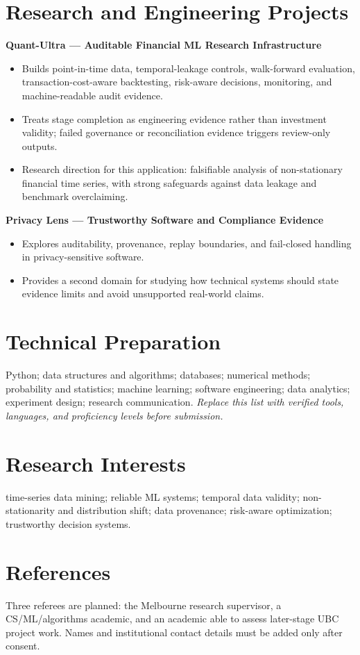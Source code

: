 \documentclass[11pt]{article}
\begin{document}
\section*{Research and Engineering Projects}
\textbf{Quant-Ultra --- Auditable Financial ML Research Infrastructure}
\begin{itemize}
\item Builds point-in-time data, temporal-leakage controls, walk-forward evaluation, transaction-cost-aware backtesting, risk-aware decisions, monitoring, and machine-readable audit evidence.
\item Treats stage completion as engineering evidence rather than investment validity; failed governance or reconciliation evidence triggers review-only outputs.
\item Research direction for this application: falsifiable analysis of non-stationary financial time series, with strong safeguards against data leakage and benchmark overclaiming.
\end{itemize}

\begin{samepage}
\textbf{Privacy Lens --- Trustworthy Software and Compliance Evidence}
\begin{itemize}
\item Explores auditability, provenance, replay boundaries, and fail-closed handling in privacy-sensitive software.
\item Provides a second domain for studying how technical systems should state evidence limits and avoid unsupported real-world claims.
\end{itemize}
\end{samepage}

\section*{Technical Preparation}
Python; data structures and algorithms; databases; numerical methods; probability and statistics; machine learning; software engineering; data analytics; experiment design; research communication. \textit{Replace this list with verified tools, languages, and proficiency levels before submission.}

\section*{Research Interests}
time-series data mining; reliable ML systems; temporal data validity; non-stationarity and distribution shift; data provenance; risk-aware optimization; trustworthy decision systems.

\section*{References}
Three referees are planned: the Melbourne research supervisor, a CS/ML/algorithms academic, and an academic able to assess later-stage UBC project work. Names and institutional contact details must be added only after consent.
\end{document}
